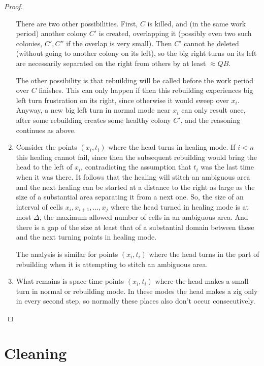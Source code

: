\documentclass[11pt]{memoir}
\theoremstyle{definition} %
\def\B{B}
\newcommand{\Q}{Q} %
\begin{document}
\begin{proof}
\begin{enumerate}
    There are two other possibilities.
    First, \( C \) is killed, and (in the same work period)
    another colony \( C' \) is created, overlapping it (possibly even two such colonies, \( C',C'' \)
    if the overlap is very small).
    Then \( C' \) cannot be deleted (without going to another colony on its left),
    so the big right turns on its left are necessarily separated on the
    right from others by at least \( \approx\Q\B \).

    The other possibility is that rebuilding will be called before the work period over \( C \) finishes.
    This can only happen if then this rebuilding experiences big left turn frustration on its right,
    since otherwise it would sweep over \( x_{i} \).
    Anyway, a new big left turn in normal mode near \( x_{i} \) can only result once, after some rebuilding
    creates some healthy colony \( C' \), and the reasoning continues as above.
    
    \item Consider the points \( (x_{i},t_{i}) \) where the head turns in healing mode.
  If \( i<n \) this healing cannot fail, since then the subsequent rebuilding would bring the head to the left
  of \( x_{i} \), contradicting the assumption that \( t_{i} \) was the last time when it was there.
  It follows that the healing will stitch an ambiguous area and the next healing can be started at a distance to the
  right as large as the size of a substantial area separating it from a next one.
  So, the size of an interval of cells \( x_{i},x_{i+1},\dots,x_{j} \) where the head turned in healing mode is at most
  \( \Delta \), the maximum allowed number of cells in an ambiguous area.
  And there is a gap of the size at least that of a substantial domain between these and the next turning
  points in healing mode.

  The analysis is similar for points \( (x_{i},t_{i}) \) where the head turns in the part of rebuilding when it is
  attempting to stitch an ambiguous area.

\item What remains is space-time points \( (x_{i},t_{i}) \)
  where the head makes a small turn in normal or rebuilding mode.
  In these modes the head makes a zig only in every second step, so normally these places also don't occur
  consecutively.
    \end{enumerate}
  
\end{proof}

\section{Cleaning}\label{sec:cleaning}
\end{document}
